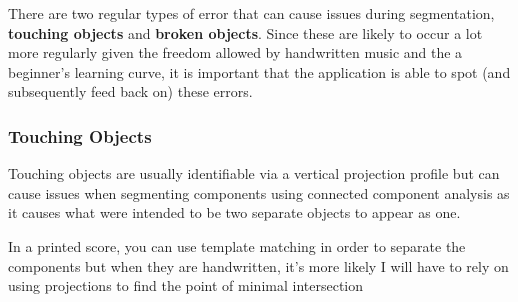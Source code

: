 There are two regular types of error that can cause issues during segmentation, \textbf{touching objects} and \textbf{broken objects}. Since these are likely to occur a lot more regularly given the freedom allowed by handwritten music and the a beginner's learning curve, it is important that the application is able to spot (and subsequently feed back on) these errors.

\subsubsection{Touching Objects}

Touching objects are usually identifiable via a vertical projection profile  but can cause issues when segmenting components using  connected component analysis as it causes what were intended to be two separate objects to appear as one.


In a printed score, you can use  template matching in order to separate the components but when they are handwritten, it's more likely I will have to rely on using projections to find the point of minimal intersection 
